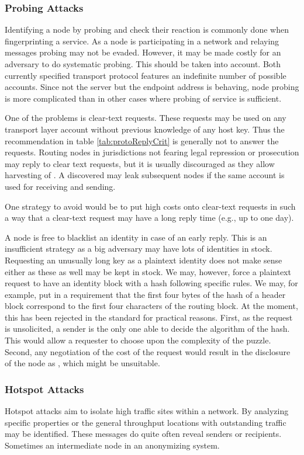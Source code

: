\subsubsection{Probing Attacks}
Identifying a node by probing and check their reaction is commonly done when fingerprinting a service. As a node is participating in a network and relaying messages probing may not be evaded. However, it may be made costly for an adversary to do systematic probing. This should be taken into account. Both currently specified transport protocol features an indefinite number of possible accounts. Since not the server but the endpoint address is behaving, node probing is more complicated than in other cases where probing of service is sufficient. 

One of the problems is clear-text requests. These requests may be used on any transport layer account without previous knowledge of any host key. Thus the recommendation in table \ref{tab:protoReplyCrit} is generally not to answer the requests. Routing nodes in jurisdictions not fearing legal repression or prosecution may reply to clear text requests, but it is usually discouraged as they allow harvesting of \VortexNodes{}. A discovered \VortexNode{} may leak subsequent nodes if the same account is used for receiving and sending.

One strategy to avoid would be to put high costs onto clear-text requests in such a way that a clear-text request may have a long reply time (e.g., up to one day). 

A node is free to blacklist an identity in case of an early reply. This is an insufficient strategy as a big adversary may have lots of identities in stock. Requesting an unusually long key as a plaintext identity does not make sense either as these as well may be kept in stock. We may, however, force a plaintext request to have an identity block with a hash following specific rules. We may, for example, put in a requirement that the first four bytes of the hash of a header block correspond to the first four characters of the routing block. At the moment, this has been rejected in the standard for practical reasons. First, as the request is unsolicited, a sender is the only one able to decide the algorithm of the hash. This would allow a requester to choose upon the complexity of the puzzle. Second, any negotiation of the cost of the request would result in the disclosure of the node as \VortexNode, which might be unsuitable.

\subsubsection{Hotspot Attacks}
Hotspot attacks aim to isolate high traffic sites within a network. By analyzing specific properties or the general throughput locations with outstanding traffic may be identified. These messages do quite often reveal senders or recipients. Sometimes an intermediate node in an anonymizing system. 

